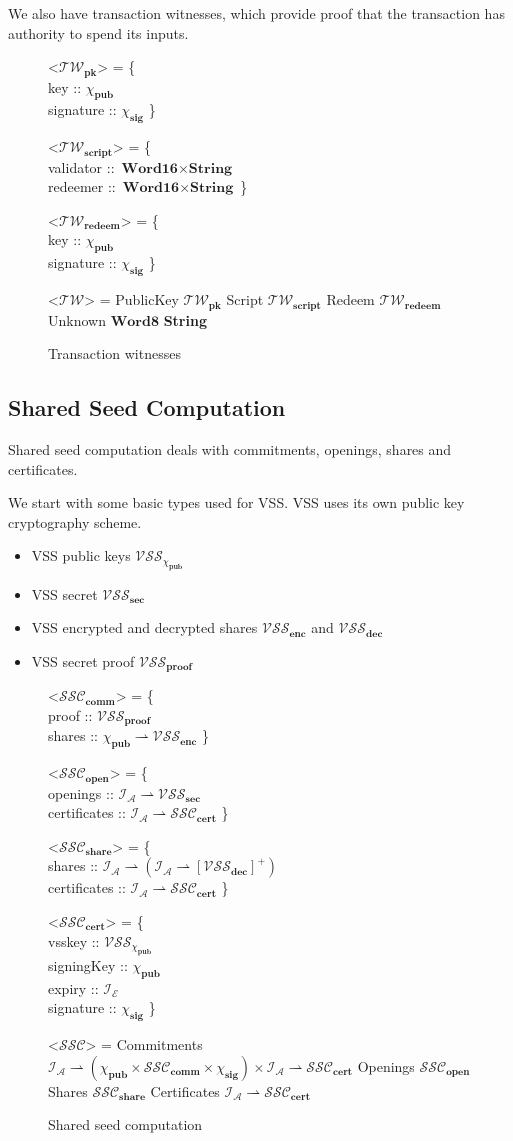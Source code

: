 \documentclass{article}
\def\fld{\\\llap{,\quad}}%
\newcommand{\rhu}{\rightharpoonup}
\newcommand{\nelists}[1]{\left[{#1}\right]^+}
\newcommand{\idsof}[1]{\mathcal{I}\!_#1}
\newcommand{\agentids}{\idsof{\agents}}
\newcommand{\epochids}{\idsof{\mathcal{E}}}
\newcommand{\pubkey}{\chi_{\textbf{pub}}}
\newcommand{\signature}{\chi_{\textbf{sig}}}
\newcommand{\vsspubkey}{\mathcal{VSS}_{\chi_{\textbf{pub}}}}
\newcommand{\vssproof}{\mathcal{VSS}_{\textbf{proof}}}
\newcommand{\vsssec}{\mathcal{VSS}_{\textbf{sec}}}
\newcommand{\vssencshare}{\mathcal{VSS}_{\textbf{enc}}}
\newcommand{\vssdecshare}{\mathcal{VSS}_{\textbf{dec}}}
\newcommand{\agents}{\mathcal{A}}
\newcommand{\twit}{\mathcal{TW}}
\newcommand{\twitpk}{\twit_{\textbf{pk}}}
\newcommand{\twitscript}{\twit_{\textbf{script}}}
\newcommand{\twitredeem}{\twit_{\textbf{redeem}}}
\newcommand{\ssc}{\mathcal{SSC}}
\newcommand{\ssccomm}{\ssc_{\textbf{comm}}}
\newcommand{\sscopen}{\ssc_{\textbf{open}}}
\newcommand{\sscshare}{\ssc_{\textbf{share}}}
\newcommand{\ssccert}{\ssc_{\textbf{cert}}}
\newcommand{\hstype}[1]{\textbf{#1}}
\newcommand{\String}{\hstype{String}}
\newcommand{\Word}[1]{\hstype{Word#1}}
\begin{document}
We also have transaction witnesses, which provide proof that the transaction has
authority to spend its inputs.

\begin{figure}[H]
  \caption{Transaction witnesses}
  \begin{grammar}
    <$\twitpk$> = \{
    \fld key :: $\pubkey$
    \fld signature :: $\signature$
    \}

    <$\twitscript$> = \{
    \fld validator :: $\Word{16}\times\String$
    \fld redeemer :: $\Word{16}\times\String$
    \}

    <$\twitredeem$> = \{
    \fld key :: $\pubkey$
    \fld signature :: $\signature$
    \}

    <$\twit$> = PublicKey $\twitpk$
    \alt Script $\twitscript$
    \alt Redeem $\twitredeem$
    \alt Unknown $\Word{8}$ \String
  \end{grammar}
\end{figure}

\subsection{Shared Seed Computation}

Shared seed computation deals with commitments, openings, shares and
certificates.

We start with some basic types used for VSS. VSS uses its own public key
cryptography scheme.

\begin{itemize}
\item VSS public keys $\vsspubkey$
\item VSS secret $\vsssec$
\item VSS encrypted and decrypted shares $\vssencshare$ and $\vssdecshare$
\item VSS secret proof $\vssproof$
\end{itemize}

\begin{figure}[H]
 \caption{Shared seed computation}
 \begin{grammar}
   <$\ssccomm$> = \{
   \fld proof :: $\vssproof$
   \fld shares :: $\pubkey \rhu \vssencshare$
   \}

   <$\sscopen$> = \{
   \fld openings :: $\agentids \rhu \vsssec$
   \fld certificates :: $\agentids \rhu \ssccert$
   \}

   <$\sscshare$> = \{
   \fld shares :: $\agentids \rhu (\agentids \rhu \nelists{\vssdecshare})$
   \fld certificates :: $\agentids \rhu \ssccert$
   \}

   <$\ssccert$> = \{
   \fld vsskey :: $\vsspubkey$
   \fld signingKey :: $\pubkey$
   \fld expiry :: $\epochids$
   \fld signature :: $\signature$
   \}

   <$\ssc$> = Commitments $\agentids \rhu (\pubkey \times \ssccomm \times \signature)\times \agentids \rhu \ssccert$
   \alt Openings $\sscopen$
   \alt Shares $\sscshare$
   \alt Certificates $\agentids \rhu \ssccert$
 \end{grammar}
\end{figure}
\end{document}
